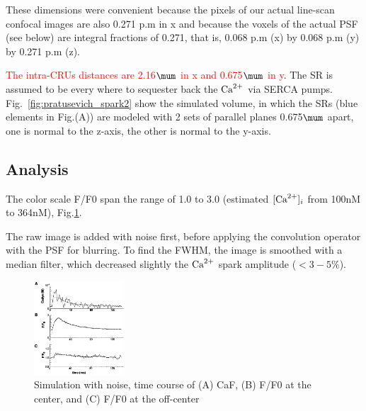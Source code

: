 \begin{framed}
  These dimensions were convenient because the pixels of our actual
  line-scan confocal images are also 0.271 p.m in x and because the
  voxels of the actual PSF (see below) are integral fractions of
  0.271, that is, 0.068 p.m (x) by 0.068 p.m (y) by 0.271 p.m (z).
\end{framed}

\textcolor{red}{The intra-CRUs distances are 2.16$\mum$ in x and
  0.675$\mum$ in y}.
The SR is assumed to be every where to sequester back the ${\text{Ca}^{2+}}$ via SERCA pumps.
Fig.~\ref{fig:pratusevich_spark2} show the simulated volume, in which the SRs
(blue elements in Fig.(A)) are modeled with 2 sets of parallel planes
0.675$\mum$ apart, one is normal to the z-axis, the other is normal to the
y-axis.



% 

\subsection{Analysis}
\label{sec:analysis-16}

The color scale F/F0 span the range of 1.0 to 3.0 (estimated $[{\text{Ca}^{2+}}]_i$ from
100nM to 364nM), Fig.\ref{fig:F_F0_pratusevich1996}.

The raw image is added with noise first, before applying the convolution
operator with the PSF for blurring. To find the FWHM, the image is smoothed with
a median filter, which decreased slightly the ${\text{Ca}^{2+}}$ spark amplitude ($< 3-5\%$).

\begin{figure}[ht]
  \centerline{\includegraphics[height=3.5cm,
    angle=0]{./images/F_F0_pratusevich1996.eps}}
    \label{fig:F_F0_pratusevich1996}
    \caption{Simulation with noise, time course of (A) CaF, (B) F/F0 at the center, and (C) F/F0 at the off-center} 
 \end{figure}
 
